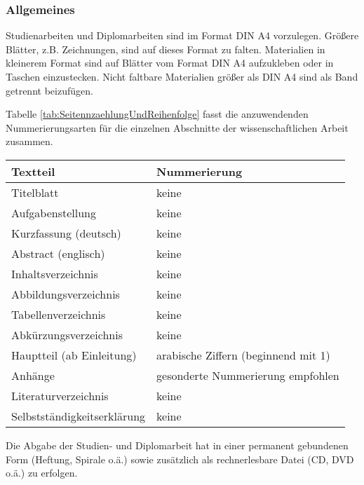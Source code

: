 \subsubsection{Allgemeines}
\label{sec:Allgemeines3}

Studienarbeiten und Diplomarbeiten sind im Format DIN A4 vorzulegen. Größere Blätter, z.B. Zeichnungen, sind auf dieses Format zu falten. Materialien in kleinerem Format sind auf Blätter vom Format DIN A4 aufzukleben oder in Taschen einzustecken. Nicht faltbare Materialien größer als DIN A4 sind als Band getrennt beizufügen.

Tabelle \ref{tab:SeitennzaehlungUndReihenfolge} fasst die anzuwendenden Nummerierungsarten für die einzelnen Abschnitte der wissenschaftlichen Arbeit zusammen.

\begin{table*}[ht]
  \centering
    \caption{Seitenzählung und Reihenfolge}
    \label{tab:SeitennzaehlungUndReihenfolge}
    \begin{tabular}{ll}
      \toprule
      Textteil                      & Nummerierung \\
      \midrule
      Titelblatt                    & keine \\
       Aufgabenstellung             & keine \\
       Kurzfassung (deutsch)        & keine \\
       Abstract (englisch)          & keine \\
       Inhaltsverzeichnis           & keine \\
       Abbildungsverzeichnis        & keine \\
       Tabellenverzeichnis          & keine \\
       Abkürzungsverzeichnis        & keine \\
       Hauptteil (ab Einleitung)    &  arabische Ziffern (beginnend mit 1)\\
       Anhänge                      & gesonderte Nummerierung empfohlen \\
       Literaturverzeichnis         & keine \\
       Selbstständigkeitserklärung  & keine \\
       \bottomrule
    \end{tabular}
\end{table*}

Die Abgabe der Studien- und Diplomarbeit hat in einer permanent gebundenen Form
(Heftung, Spirale o.ä.) sowie zusätzlich als rechnerlesbare Datei (CD,
DVD o.ä.) zu erfolgen.


